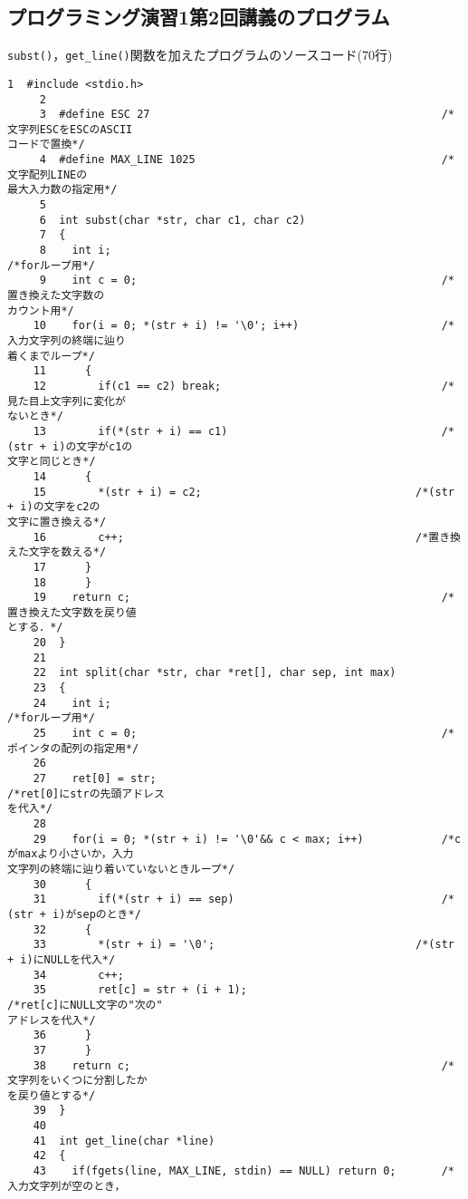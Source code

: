 \subsection{プログラミング演習1第2回講義のプログラム}\label{func2}
\verb|subst()|，\verb|get_line()|関数を加えたプログラムのソースコード(70行)
\begin{Verbatim}[fontsize=\small, baselinestretch=0.8]
     1	#include <stdio.h>
     2	
     3	#define ESC 27                                             /*文字列ESCをESCのASCII
コードで置換*/
     4	#define MAX_LINE 1025                                      /*文字配列LINEの
最大入力数の指定用*/
     5	
     6	int subst(char *str, char c1, char c2)
     7	{
     8	  int i;                                                   /*forループ用*/
     9	  int c = 0;                                               /*置き換えた文字数の
カウント用*/
    10	  for(i = 0; *(str + i) != '\0'; i++)                      /*入力文字列の終端に辿り
着くまでループ*/
    11	    {
    12	      if(c1 == c2) break;                                  /*見た目上文字列に変化が
ないとき*/
    13	      if(*(str + i) == c1)                                 /*(str + i)の文字がc1の
文字と同じとき*/
    14		{
    15		  *(str + i) = c2;                                 /*(str + i)の文字をc2の
文字に置き換える*/
    16		  c++;                                             /*置き換えた文字を数える*/
    17		}
    18	    }
    19	  return c;                                                /*置き換えた文字数を戻り値
とする．*/
    20	}
    21	
    22	int split(char *str, char *ret[], char sep, int max)
    23	{
    24	  int i;                                                   /*forループ用*/
    25	  int c = 0;                                               /*ポインタの配列の指定用*/
    26	
    27	  ret[0] = str;                                            /*ret[0]にstrの先頭アドレス
を代入*/
    28	
    29	  for(i = 0; *(str + i) != '\0'&& c < max; i++)            /*cがmaxより小さいか，入力
文字列の終端に辿り着いていないときループ*/
    30	    {
    31	      if(*(str + i) == sep)                                /*(str + i)がsepのとき*/
    32		{
    33		  *(str + i) = '\0';                               /*(str + i)にNULLを代入*/
    34		  c++;
    35		  ret[c] = str + (i + 1);                          /*ret[c]にNULL文字の"次の"
アドレスを代入*/
    36		}
    37	    }
    38	  return c;                                                /*文字列をいくつに分割したか
を戻り値とする*/
    39	}
    40	
    41	int get_line(char *line)
    42	{
    43	  if(fgets(line, MAX_LINE, stdin) == NULL) return 0;       /*入力文字列が空のとき，

\end{Verbatim}
